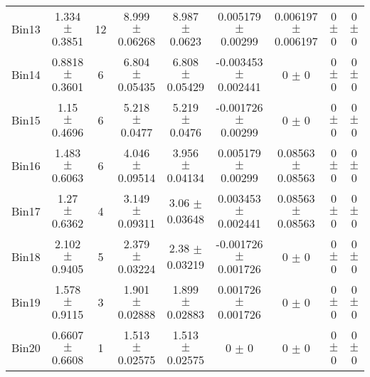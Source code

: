 \begin{tabular}{@{\extracolsep{4pt}}lcccccccc@{}}
     Bin13 & 1.334 $\pm$ 0.3851 & 12 & 8.999 $\pm$ 0.06268 & 8.987 $\pm$ 0.0623 & 0.005179 $\pm$ 0.00299 & 0.006197 $\pm$ 0.006197 & 0 $\pm$ 0 & 0 $\pm$ 0 \\ 
     Bin14 & 0.8818 $\pm$ 0.3601 & 6 & 6.804 $\pm$ 0.05435 & 6.808 $\pm$ 0.05429 & -0.003453 $\pm$ 0.002441 & 0 $\pm$ 0 & 0 $\pm$ 0 & 0 $\pm$ 0 \\ 
     Bin15 & 1.15 $\pm$ 0.4696 & 6 & 5.218 $\pm$ 0.0477 & 5.219 $\pm$ 0.0476 & -0.001726 $\pm$ 0.00299 & 0 $\pm$ 0 & 0 $\pm$ 0 & 0 $\pm$ 0 \\ 
     Bin16 & 1.483 $\pm$ 0.6063 & 6 & 4.046 $\pm$ 0.09514 & 3.956 $\pm$ 0.04134 & 0.005179 $\pm$ 0.00299 & 0.08563 $\pm$ 0.08563 & 0 $\pm$ 0 & 0 $\pm$ 0 \\ 
     Bin17 & 1.27 $\pm$ 0.6362 & 4 & 3.149 $\pm$ 0.09311 & 3.06 $\pm$ 0.03648 & 0.003453 $\pm$ 0.002441 & 0.08563 $\pm$ 0.08563 & 0 $\pm$ 0 & 0 $\pm$ 0 \\ 
     Bin18 & 2.102 $\pm$ 0.9405 & 5 & 2.379 $\pm$ 0.03224 & 2.38 $\pm$ 0.03219 & -0.001726 $\pm$ 0.001726 & 0 $\pm$ 0 & 0 $\pm$ 0 & 0 $\pm$ 0 \\ 
     Bin19 & 1.578 $\pm$ 0.9115 & 3 & 1.901 $\pm$ 0.02888 & 1.899 $\pm$ 0.02883 & 0.001726 $\pm$ 0.001726 & 0 $\pm$ 0 & 0 $\pm$ 0 & 0 $\pm$ 0 \\ 
     Bin20 & 0.6607 $\pm$ 0.6608 & 1 & 1.513 $\pm$ 0.02575 & 1.513 $\pm$ 0.02575 & 0 $\pm$ 0 & 0 $\pm$ 0 & 0 $\pm$ 0 & 0 $\pm$ 0 \\ 
\hline\hline
  \end{tabular}
